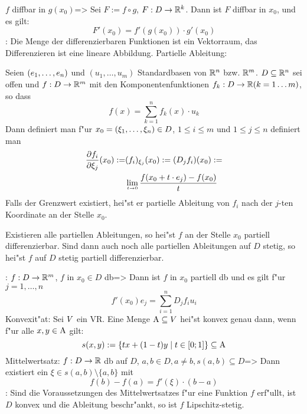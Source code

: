   $f$ diffbar in $g(x_0)$=>{
  Sei $F:=f\circ g$, $F:D\to\mathbb R^k$. Dann ist $F$ diffbar in $x_0$, 
  und es gilt:
  \[F'(x_0)=f'(g(x_0))\cdot g'(x_0)
    \]
  }
\remark:{
  Die Menge der differenzierbaren Funktionen ist ein Vektorraum, 
  das Differenzieren ist eine lineare Abbildung.
  }
 Partielle Ableitung:{
  Seien $(e_1,\ldots,e_n)$ und $(u_1,\ldots,u_m)$ Standardbasen von $\mathbb R^n$ bzw.
  $\mathbb R^m$. $D\subseteq\mathbb R^n$ sei offen und $f:D\to\mathbb R^m$ mit
  den Komponentenfunktionen $f_k:D\to\mathbb R (k=1\ldots m)$, so dass
  \[f(x)=\sum_{k=1}^n f_k(x)\cdot u_k
    \]
  Dann definiert man f"ur $x_0=(\xi_1,\ldots,\xi_n)\in D$, $1\leq i\leq m$ und 
  $1\leq j\leq n$ definiert man
  \begin{align*}
    \frac{\partial f_i}{\partial \xi_j}(x_0):=&
      (f_i)_{\xi_j}(x_0):=
      (D_jf_i)(x_0):= \\
    & \limes t->0 \frac{f(x_0+t\cdot e_j)-f(x_0)}t
    \end{align*}
  Falls der Grenzwert existiert, hei"st er partielle Ableitung von $f_i$
  nach der $j$-ten Koordinate an der Stelle $x_0$.
  
  Existieren alle partiellen Ableitungen, so hei"st $f$ an der Stelle $x_0$
  partiell differenzierbar. Sind dann auch noch alle partiellen Ableitungen
  auf $D$ stetig, so hei"st $f$ auf $D$ stetig partiell 
  differenzierbar.
  }
\theorem:
  $f:D\to\mathbb R^m$, $f$ in $x_0\in D$ db=>{
  Dann ist $f$ in $x_0$ partiell db und es gilt f"ur $j=1,\ldots,n$
  \[f'(x_0)e_j=\sum_{i=1}^n D_jf_iu_i
    \]
  }
 Konvexit"at:{
  Sei $V$ ein VR. Eine Menge ${\rm A}\subseteq V$ hei"st konvex genau
  dann, wenn f"ur alle $x,y\in{\rm A}$ gilt:
  \[s(x,y):=\{tx+(1-t)y\mid t\in[0;1]\}\subseteq{\rm A}
    \]
  }
\theorem Mittelwertsatz:
  $f:D\to\mathbb R$ db auf $D$, $a,b\in D,a\neq b,s(a,b)\subseteq D$=>{
  Dann existiert ein $\xi\in s(a,b)\setminus\{a,b\}$ mit 
  \[f(b)-f(a)=f'(\xi)\cdot(b-a)
    \]
  }
\remark:{
  Sind die Voraussetzungen des Mittelwertsatzes f"ur eine Funktion $f$ 
  erf"ullt, ist $D$ konvex und die Ableitung beschr"ankt, so ist $f$
  Lipschitz-stetig.
  }
